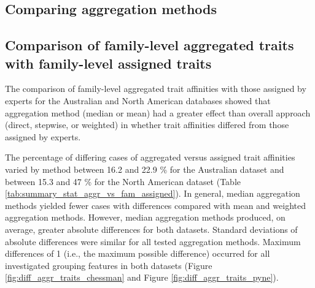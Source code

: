 \documentclass{article}
\begin{document}

\subsection*{Comparing aggregation methods} 

\subsection*{Comparison of family-level aggregated traits with family-level assigned traits}
\label{sec:diff_trait_agg_chessman}


The comparison of family-level aggregated trait affinities with those assigned by experts for the Australian and North American databases showed that aggregation method (median or mean) had a greater effect than overall approach (direct, stepwise, or weighted) in whether trait affinities differed from those assigned by experts.

The percentage of differing cases of aggregated versus assigned trait affinities varied by method between 16.2 and 22.9 \% for the Australian dataset and between 15.3 and 47 \% for the North American dataset (Table \ref{tab:summary_stat_aggr_vs_fam_assigned}). In general, median aggregation methods yielded fewer cases with differences compared with mean and weighted aggregation methods. However, median aggregation methods produced, on average, greater absolute differences for both datasets. Standard deviations of absolute differences were similar for all tested aggregation methods. Maximum differences of 1 (i.e., the maximum possible difference) occurred for all investigated grouping features in both datasets (Figure \ref{fig:diff_aggr_traits_chessman} and Figure \ref{fig:diff_aggr_traits_pyne}).
\end{document}
